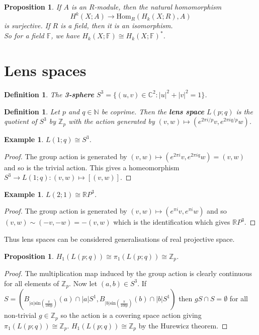 \documentclass{article}
\newtheorem{definition}[theorem]{Definition}
\newtheorem{proposition}[theorem]{Proposition}
\newtheorem{example}[theorem]{Example}
\begin{document}
\begin{proposition}
If $A$ is an $R$-module, then the natural homomorphism\[H^k(X;A)\to\text{Hom}_R(H_k(X;R),A)\]is surjective. If $R$ is a field, then it is an isomorphism.\\
So for a field $\mathbb{F}$, we have $H_k(X;\mathbb{F})\cong H_k(X;\mathbb{F})^*$.
\end{proposition}



\section{Lens spaces}

\begin{definition}
The \textbf{3-sphere } $S^3=\{(u,v)\in\mathbb{C}^2:|u|^2+|v|^2=1\}$.
\end{definition}

\begin{definition}
Let $p$ and $q\in\mathbb{N}$ be coprime. Then the \textbf{lens space} $L(p;q)$ is the quotient of $S^3$ by $\mathbb{Z}_p$ with the action generated by $(v,w)\mapsto(e^{2\pi i/p}v,e^{2\pi iq/p}w)$.
\end{definition}

\begin{example}
$L(1;q)\cong S^3$.
\end{example}
\begin{proof}
The group action is generated by $(v,w)\mapsto(e^{2\pi i}v,e^{2\pi iq}w)=(v,w)$ and so is the trivial action. This gives a homeomorphism $S^3\to L(1;q):(v,w)\mapsto[(v,w)]$.
\end{proof}

\begin{example}
$L(2;1)\cong\mathbb{R}P^3$.
\end{example}
\begin{proof}
The group action is generated by $(v,w)\mapsto(e^{\pi i}v,e^{\pi i}w)$ and so $(v,w)\sim(-v,-w)=-(v,w)$ which is the identification which gives $\mathbb{R}P^3$.
\end{proof}

\noindent Thus lens spaces can be considered generalisations of real projective space.

\begin{proposition}
$H_1(L(p;q))\cong\pi_1(L(p;q))\cong \mathbb{Z}_p$.
\end{proposition}
\begin{proof}
The multiplication map induced by the group action is clearly continuous for all elements of $\mathbb{Z}_p$.
Now let $(a,b)\in S^3$. If $S=(B_{|a|\text{sin}(\frac{\pi}{100p})}(a)\cap |a|S^1,B_{|b|\text{sin}(\frac{\pi}{100p})}(b)\cap |b|S^1)$ then $gS\cap S=\emptyset$ for all non-trivial $g\in \mathbb{Z}_p$ so the action is a covering space action giving $\pi_1(L(p;q))\cong \mathbb{Z}_p$. $H_1(L(p;q))\cong \mathbb{Z}_p$ by the Hurewicz theorem.
\end{proof}
\end{document}
